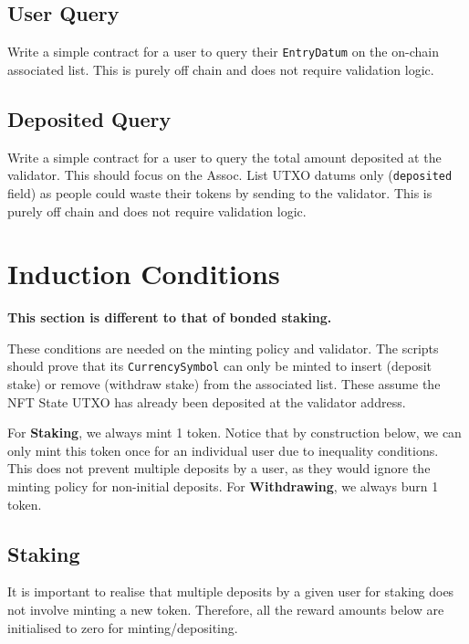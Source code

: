 \documentclass[10pt, a4paper]{article}
\theoremstyle{definition}
\begin{document}
\subsection{User Query}\label{subsection:UserQuery}
Write a simple contract for a user to query their \texttt{EntryDatum} on the on-chain associated list. This is purely off chain and does not require validation logic.

\subsection{Deposited Query}\label{subsection:DepositedQuery}
Write a simple contract for a user to query the total amount deposited at the validator. This should focus on the Assoc. List UTXO datums only (\texttt{deposited} field) as people could waste their tokens by sending to the validator. This is purely off chain and does not require validation logic.

\section{Induction Conditions}\label{section:Induction}
\textbf{This section is different to that of bonded staking.}

These conditions are needed on the minting policy and validator. The scripts should prove that its \texttt{CurrencySymbol} can only be minted to insert (deposit stake) or remove (withdraw stake) from the associated list. These assume the NFT State UTXO has already been deposited at the validator address.

For \textbf{Staking}, we always mint 1 token. Notice that by construction below, we can only mint this token once for an individual user due to inequality conditions. This does not prevent multiple deposits by a user, as they would ignore the minting policy for non-initial deposits.
For \textbf{Withdrawing}, we always burn 1 token.

\subsection{Staking}\label{subsection:staking}

It is important to realise that multiple deposits by a given user for staking does not involve minting a new token. Therefore, all the reward amounts below are initialised to zero for minting/depositing.
\end{document}
